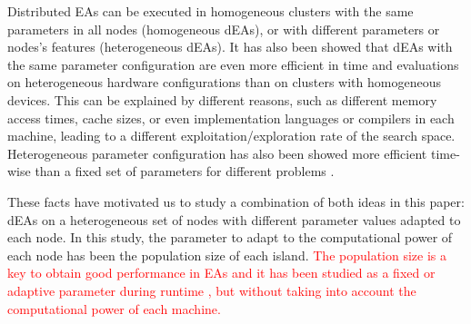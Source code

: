 \documentclass[final,1p,times]{elsarticle}
\begin{document}
Distributed EAs can be executed in homogeneous clusters with the same parameters in all nodes (homogeneous dEAs), or with different parameters or nodes's features (heterogeneous dEAs).
It  has also been showed \cite{HETEROGENEOUSHARD} that dEAs with the same parameter configuration are even
more efficient in time and evaluations on heterogeneous hardware configurations than on clusters with
homogeneous devices. This can be explained by different reasons, such
as different memory access times, cache sizes, %
or even implementation
languages or compilers in each machine, leading to a different
exploitation/exploration rate of the search space. %
Heterogeneous parameter
configuration  has also been showed more  efficient time-wise than a fixed
set %
of parameters for different problems
\cite{HETEROGENEOUSPARAMETERS}.   %

These facts have motivated us to study a combination of both ideas in this paper: dEAs on a heterogeneous set of nodes with different parameter values adapted to each node. In this study, the parameter to adapt to the computational power of each node has been the population size of each island. \textcolor{red}{The population size is a key to obtain good performance in EAs \cite{ShrinkageLaredo09} and it has been studied as a fixed \cite{SizingHarik99} or adaptive parameter during runtime \cite{AdaptiveLobo07}, but without taking into account the computational power of each machine.}
\end{document}
